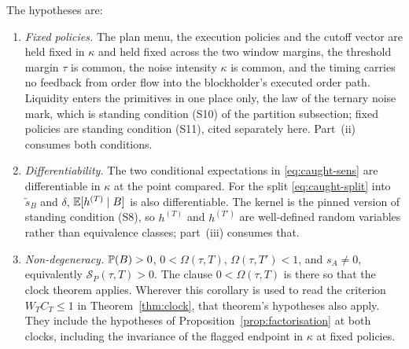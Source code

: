 The hypotheses are:
\begin{enumerate}[label=(C-\arabic*),leftmargin=3.2em,itemsep=3pt]
\item \emph{Fixed policies.} The plan menu, the execution policies and the cutoff vector are held
  fixed in $\kappa$ and held fixed across the two window margins, the threshold margin $\tau$ is
  common, the noise intensity $\kappa$ is common, and the timing carries no feedback from order
  flow into the blockholder's executed order path. Liquidity enters the primitives in one place
  only, the law of the ternary noise mark, which is standing condition (S10) of the partition
  subsection; fixed policies are standing condition (S11), cited separately here. Part~(ii)
  consumes both conditions.
\item \emph{Differentiability.} The two conditional expectations in \eqref{eq:caught-sens} are
  differentiable in $\kappa$ at the point compared. For the split \eqref{eq:caught-split} into
  $\tilde s_B$ and $\delta$, $\mathbb{E}[h^{(T)}\mid B]$ is also differentiable. The kernel is the
  pinned version of
  standing condition (S8), so $h^{(T)}$ and $h^{(T')}$ are well-defined random variables rather
  than equivalence classes; part~(iii) consumes that.
\item \emph{Non-degeneracy.} $\mathbb{P}(B) > 0$, $0 < \Omega(\tau,T)$, $\Omega(\tau,T') < 1$, and
  $s_A \ne 0$, equivalently $\mathcal{S}_P(\tau,T) > 0$. The clause $0 < \Omega(\tau,T)$ is there
  so that the clock theorem applies. Wherever this corollary is used to read the criterion
  $W_T C_T \le 1$ in Theorem~\ref{thm:clock}, that theorem's hypotheses also apply. They include
  the hypotheses of Proposition~\ref{prop:factorisation} at both clocks, including the invariance
  of the flagged endpoint in $\kappa$ at fixed policies.
\end{enumerate}

